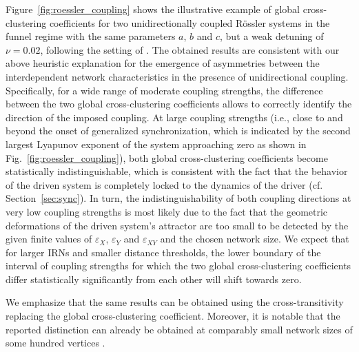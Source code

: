 		Figure~\ref{fig:roessler_coupling} shows the illustrative example of global cross-clustering coefficients for two unidirectionally coupled R\"ossler systems in the funnel regime with the same parameters $a$, $b$ and $c$, but a weak detuning of $\nu=0.02$, following the setting of \cite{Feldhoff2012}. The obtained results are consistent with our above heuristic explanation for the emergence of asymmetries between the interdependent network characteristics in the presence of unidirectional coupling. Specifically, for a wide range of moderate coupling strengths, the difference between the two global cross-clustering coefficients allows to correctly identify the direction of the imposed coupling. At large coupling strengths (i.e., close to and beyond the onset of generalized synchronization, which is indicated by the second largest Lyapunov exponent of the system approaching zero as shown in Fig.~\ref{fig:roessler_coupling}), both global cross-clustering coefficients become statistically indistinguishable, which is consistent with the fact that the behavior of the driven system is completely locked to the dynamics of the driver (cf. Section~\ref{sec:sync}). In turn, the indistinguishability of both coupling directions at very low coupling strengths is most likely due to the fact that the geometric deformations of the driven system's attractor are too small to be detected by the given finite values of $\varepsilon_X$, $\varepsilon_Y$ and $\varepsilon_{XY}$ and the chosen network size. We expect that for larger IRNs and smaller distance thresholds, the lower boundary of the interval of coupling strengths for which the two global cross-clustering coefficients differ statistically significantly from each other will shift towards zero.

		We emphasize that the same results can be obtained using the cross-transitivity replacing the global cross-clustering coefficient. Moreover, it is notable that the reported distinction can already be obtained at comparably small network sizes of some hundred vertices \cite{Feldhoff2012}.

